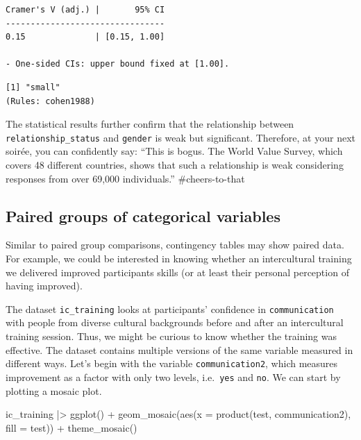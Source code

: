 \documentclass[
  letterpaper,
]{krantz}
\makeatletter
\newenvironment{Shaded}{\begin{snugshade}}{\end{snugshade}}
\newcommand{\AttributeTok}[1]{\textcolor[rgb]{0.40,0.45,0.13}{#1}}
\newcommand{\FunctionTok}[1]{\textcolor[rgb]{0.28,0.35,0.67}{#1}}
\newcommand{\NormalTok}[1]{\textcolor[rgb]{0.00,0.23,0.31}{#1}}
\newcommand{\SpecialCharTok}[1]{\textcolor[rgb]{0.37,0.37,0.37}{#1}}
\newcommand{\StringTok}[1]{\textcolor[rgb]{0.13,0.47,0.30}{#1}}
\newenvironment{kframe}{%
\medskip{}
\setlength{\fboxsep}{.8em}
 \def\at@end@of@kframe{}%
 \ifinner\ifhmode%
  \def\at@end@of@kframe{\end{minipage}}%
  \begin{minipage}{\columnwidth}%
 \fi\fi%
 \def\FrameCommand##1{\hskip\@totalleftmargin \hskip-\fboxsep
 \colorbox{shadecolor}{##1}\hskip-\fboxsep
     \hskip-\linewidth \hskip-\@totalleftmargin \hskip\columnwidth}%
 \MakeFramed {\advance\hsize-\width
   \@totalleftmargin\z@ \linewidth\hsize
   \@setminipage}}%
 {\par\unskip\endMakeFramed%
 \at@end@of@kframe}
\renewenvironment{Shaded}{\begin{kframe}}{\end{kframe}}
\makeatother
\begin{document}
\begin{verbatim}
Cramer's V (adj.) |       95% CI
--------------------------------
0.15              | [0.15, 1.00]

- One-sided CIs: upper bound fixed at [1.00].
\end{verbatim}

\begin{Shaded}
\end{Shaded}

\begin{verbatim}
[1] "small"
(Rules: cohen1988)
\end{verbatim}

The statistical results further confirm that the relationship between
\texttt{relationship\_status} and \texttt{gender} is weak but
significant. Therefore, at your next soirée, you can confidently say:
``This is bogus. The World Value Survey, which covers 48 different
countries, shows that such a relationship is weak considering responses
from over 69,000 individuals.'' \#cheers-to-that

\subsection{Paired groups of categorical
variables}\label{sec-paired-groups-categorical-variables}

Similar to paired group comparisons, contingency tables may show paired
data. For example, we could be interested in knowing whether an
intercultural training we delivered improved participants skills (or at
least their personal perception of having improved).

The dataset \texttt{ic\_training} looks at participants' confidence in
\texttt{communication} with people from diverse cultural backgrounds
before and after an intercultural training session. Thus, we might be
curious to know whether the training was effective. The dataset contains
multiple versions of the same variable measured in different ways. Let's
begin with the variable \texttt{communication2}, which measures
improvement as a factor with only two levels, i.e.~\texttt{yes} and
\texttt{no}. We can start by plotting a mosaic plot.

\begin{Shaded}
\begin{Highlighting}[]
\NormalTok{ic\_training }\SpecialCharTok{|\textgreater{}}
  \FunctionTok{ggplot}\NormalTok{() }\SpecialCharTok{+}
  \FunctionTok{geom\_mosaic}\NormalTok{(}\FunctionTok{aes}\NormalTok{(}\AttributeTok{x =} \FunctionTok{product}\NormalTok{(test, communication2),}
                  \AttributeTok{fill =}\NormalTok{ test)) }\SpecialCharTok{+}
  \FunctionTok{theme\_mosaic}\NormalTok{()}
\end{Highlighting}
\end{Shaded}
\end{document}

